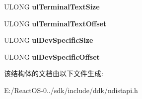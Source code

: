 \begin{DoxyCompactItemize}
U\+L\+O\+NG {\bfseries ul\+Terminal\+Text\+Size}
\item 
\mbox{\label{struct___l_i_n_e___d_e_v___c_a_p_s_acf18c5a0d9566b532c5c73b4ef8551de}} 
U\+L\+O\+NG {\bfseries ul\+Terminal\+Text\+Offset}
\item 
\mbox{\label{struct___l_i_n_e___d_e_v___c_a_p_s_a152800ecde8f9f326c60080244fce885}} 
U\+L\+O\+NG {\bfseries ul\+Dev\+Specific\+Size}
\item 
\mbox{\label{struct___l_i_n_e___d_e_v___c_a_p_s_af1f127e6accb7a96367620bfa041105c}} 
U\+L\+O\+NG {\bfseries ul\+Dev\+Specific\+Offset}
\end{DoxyCompactItemize}


该结构体的文档由以下文件生成\+:\begin{DoxyCompactItemize}
\item 
E\+:/\+React\+O\+S-\/0../sdk/include/ddk/ndistapi.\+h\end{DoxyCompactItemize}
